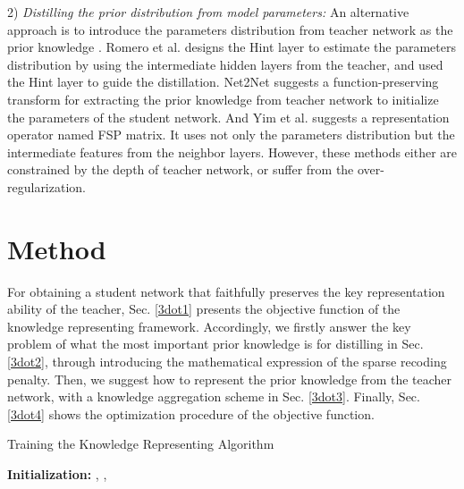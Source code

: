 \documentclass[10pt,twocolumn,letterpaper]{article}
\begin{document}
2) \emph{Distilling the prior distribution from model parameters:}
An alternative approach is to
introduce the parameters distribution from teacher network
as the prior knowledge \cite{Romero2014FitNets, yim2017gift, Zagoruyko2017Paying}.
Romero et al. \cite{Romero2014FitNets} designs the Hint layer to
estimate the parameters distribution
by using the intermediate hidden layers from the teacher,
and used the Hint layer to guide the distillation.
Net2Net \cite{Chen2015Net2Net} suggests a function-preserving transform
for extracting the prior knowledge from teacher network
to initialize the parameters of the student network.
And Yim et al. \cite{yim2017gift} suggests
a representation operator named FSP matrix.
It uses not only the parameters distribution
but the intermediate features from the neighbor layers.
However,
these methods either are constrained by the depth of teacher network,
or suffer from the over-regularization.





\section{Method}
For obtaining a student network that
faithfully preserves the key representation ability of the teacher,
Sec. \ref{3dot1} presents the objective function
of the knowledge representing framework.
Accordingly,
we firstly answer the key problem of
what the most important prior knowledge is for distilling in Sec. \ref{3dot2},
through introducing the mathematical expression of the sparse recoding penalty.
Then,
we suggest how to represent the prior knowledge from the teacher network,
with a knowledge aggregation scheme in Sec. \ref{3dot3}.
Finally, Sec. \ref{3dot4} shows the optimization procedure
of the objective function.

\begin{algorithm}[b]
    \caption{Training the Knowledge Representing Algorithm}
    \textbf{Initialization:} , , \;
\label{alg:frame}
\end{algorithm}
\end{document}
